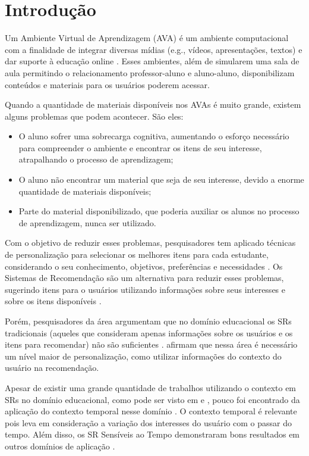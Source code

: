 \chapter{Introdução}\label{introducao}

Um Ambiente Virtual de Aprendizagem (AVA) é um ambiente computacional com a finalidade de integrar diversas mídias
(e.g., vídeos, apresentações, textos) e dar suporte à educação online \cite{drachsler2015panorama}. Esses ambientes, além de simularem uma sala
de aula permitindo o relacionamento professor-aluno e aluno-aluno, disponibilizam conteúdos e materiais para os usuários
poderem acessar.

Quando a quantidade de materiais disponíveis nos AVAs é muito grande, existem alguns problemas que podem acontecer. São eles:

\begin{itemize}
\item O aluno sofrer uma sobrecarga cognitiva, aumentando o esforço necessário para compreender o ambiente
e encontrar os itens de seu interesse, atrapalhando o processo de aprendizagem;
\item O aluno não encontrar um material que seja de seu interesse, devido a enorme quantidade de materiais disponíveis;
\item Parte do material disponibilizado, que poderia auxiliar os alunos no processo de aprendizagem, nunca ser
utilizado.
\end{itemize}

Com o objetivo de reduzir esses problemas, pesquisadores tem aplicado técnicas de personalização para selecionar os melhores itens para cada estudante,
considerando o seu conhecimento, objetivos, preferências e necessidades \cite{brusilovsky1998methods}. Os Sistemas de Recomendação são um alternativa
para reduzir esses problemas, sugerindo itens para o usuários utilizando informações sobre seus interesses e sobre os itens disponíveis \cite{adomavicius2005toward}.

Porém, pesquisadores da área argumentam que no domínio educacional os SRs tradicionais (aqueles que consideram apenas
informações sobre os usuários e os itens para recomendar) não são suficientes \cite{verbert2012context, drachsler2015panorama}.
 afirmam que nessa área é necessário um nível maior de personalização, como utilizar informações
do contexto do usuário na recomendação.

Apesar de existir uma grande quantidade de trabalhos utilizando o contexto em SRs no domínio educacional, como pode ser visto
em  e , pouco foi encontrado da aplicação do contexto
temporal nesse domínio \cite{de2017time}. O contexto temporal é relevante pois leva em consideração a variação dos
interesses do usuário com o passar do tempo. Além disso, os SR Sensíveis ao Tempo demonstraram bons resultados em outros
domínios de aplicação \cite{campos2014time}.

